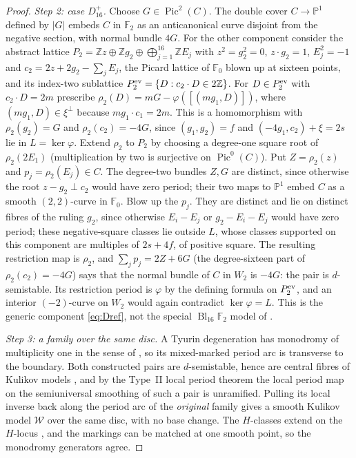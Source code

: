 \documentclass[11pt]{article}
\newcommand{\Z}{\mathbb Z}
\newcommand{\PP}{\mathbb P}
\newcommand{\F}{\mathbb F}
\newcommand{\Pic}{\operatorname{Pic}}
\newcommand{\Bl}{\operatorname{Bl}}
\newcommand{\calW}{\mathcal W}
\theoremstyle{definition}
\theoremstyle{remark}
\begin{document}
\begin{proof}
\emph{Step 2: case \(D_{16}^+\).}
Choose \(G\in\Pic^2(C)\). The double cover \(C\to\PP^1\) defined by
\(|G|\) embeds \(C\) in \(\F_2\) as an anticanonical curve disjoint
from the negative section, with normal bundle \(4G\). For the other
component consider the abstract lattice
\(P_2=\Z z\oplus\Z g_2\oplus\bigoplus_{j=1}^{16}\Z E_j\) with
\(z^2=g_2^2=0\), \(z\cdot g_2=1\), \(E_j^2=-1\) and
\(c_2=2z+2g_2-\sum_jE_j\),
the Picard lattice of \(\F_0\) blown up at sixteen points, and its
index-two sublattice \(P_2^{\rm ev}=\{D: c_2\cdot D\in2\Z\}\). For
\(D\in P_2^{\rm ev}\) with \(c_2\cdot D=2m\) prescribe
\(\rho_2(D)=mG-\varphi([(mg_1,D)])\), where \((mg_1,D)\in\xi^\perp\)
because \(mg_1\cdot c_1=2m\). This is a homomorphism with
\(\rho_2(g_2)=G\) and \(\rho_2(c_2)=-4G\), since \((g_1,g_2)=f\) and
\((-4g_1,c_2)+\xi=2s\) lie in \(L=\ker\varphi\). Extend \(\rho_2\) to
\(P_2\) by choosing a degree-one square root of \(\rho_2(2E_1)\)
(multiplication by two is surjective on \(\Pic^0(C)\)). Put
\(Z=\rho_2(z)\) and \(p_j=\rho_2(E_j)\in C\). The degree-two bundles
\(Z,G\) are distinct, since otherwise the root \(z-g_2\perp c_2\)
would have zero period; their two maps to \(\PP^1\) embed \(C\) as a
smooth \((2,2)\)-curve in \(\F_0\). Blow up the \(p_j\). They are
distinct and lie on distinct fibres of the ruling \(g_2\), since
otherwise \(E_i-E_j\) or \(g_2-E_i-E_j\) would have zero period; these
negative-square classes lie outside \(L\), whose classes supported on
this component are multiples of \(2s+4f\), of positive square. The
resulting restriction map is \(\rho_2\), and \(\sum_jp_j=2Z+6G\) (the
degree-sixteen part of \(\rho_2(c_2)=-4G\)) says that the normal
bundle of \(C\) in \(W_2\) is \(-4G\): the pair is \(d\)-semistable.
Its restriction period is \(\varphi\) by the defining formula on
\(P_2^{\rm ev}\), and an interior \((-2)\)-curve on \(W_2\) would again
contradict \(\ker\varphi=L\). This is the generic component
\eqref{eq:Dref}, not the special \(\Bl_{16}\F_2\) model of
\cite[\S7F]{ABE}.

\emph{Step 3: a family over the same disc.}
A Tyurin degeneration has monodromy of multiplicity one in the sense
of \cite[Theorem~3.13]{AE}, so its mixed-marked period arc is
transverse to the boundary. Both constructed pairs are
\(d\)-semistable, hence are central fibres of Kulikov models
\cite{Fr83}, and by the Type~II local period theorem
\cite[Theorem~7.1, Corollary~7.24]{AE} the local period map on the
semiuniversal smoothing of such a pair is unramified. Pulling its
local inverse back along the period arc of the \emph{original} family
gives a smooth Kulikov model \(\calW\) over the same disc, with no base
change. The \(H\)-classes extend on the \(H\)-locus \cite[\S7E]{AE},
and the markings can be matched at one smooth point, so the monodromy
generators agree.


\end{proof}
\end{document}
